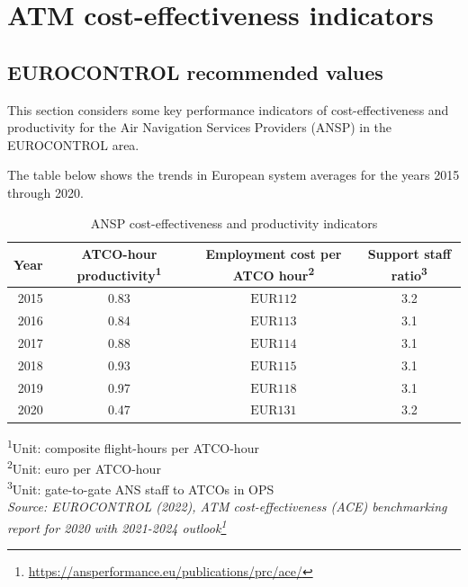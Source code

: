 \documentclass[
  11pt,
  a4paper,
]{book}
\DeclareRobustCommand{\href}[2]{#2\footnote{\url{#1}}}
\begin{document}
\hypertarget{sec-atm-cost-effectiveness-indicators}{%
\chapter{ATM cost-effectiveness
indicators}\label{sec-atm-cost-effectiveness-indicators}}

\hypertarget{eurocontrol-recommended-values-13}{%
\section{EUROCONTROL recommended
values}\label{eurocontrol-recommended-values-13}}

This section considers some key performance indicators of
cost-effectiveness and productivity for the Air Navigation Services
Providers (ANSP) in the EUROCONTROL area.

The table below shows the trends in European system averages for the
years 2015 through 2020.

\hypertarget{tbl-atm-cost-effectiveness}{}
\setlength{\LTpost}{0mm}
\begin{longtable}{rccc}
\caption{\label{tbl-atm-cost-effectiveness}ANSP cost-effectiveness and productivity indicators }\tabularnewline

\toprule
Year & ATCO-hour productivity\textsuperscript{1} & Employment cost per ATCO hour\textsuperscript{2} & Support staff ratio\textsuperscript{3} \\ 
\midrule
2015 & 0.83 & $\text{EUR}112$ & 3.2 \\ 
2016 & 0.84 & $\text{EUR}113$ & 3.1 \\ 
2017 & 0.88 & $\text{EUR}114$ & 3.1 \\ 
2018 & 0.93 & $\text{EUR}115$ & 3.1 \\ 
2019 & 0.97 & $\text{EUR}118$ & 3.1 \\ 
2020 & 0.47 & $\text{EUR}131$ & 3.2 \\ 
\bottomrule
\end{longtable}
\begin{minipage}{\linewidth}
\textsuperscript{1}Unit: composite flight-hours per ATCO-hour\\
\textsuperscript{2}Unit: euro per ATCO-hour\\
\textsuperscript{3}Unit: gate-to-gate ANS staff to ATCOs in OPS\\
\emph{Source: \href{https://ansperformance.eu/publications/prc/ace/}{EUROCONTROL (2022), ATM cost-effectiveness (ACE) benchmarking report for 2020 with 2021-2024 outlook}}\\
\end{minipage}
\end{document}

